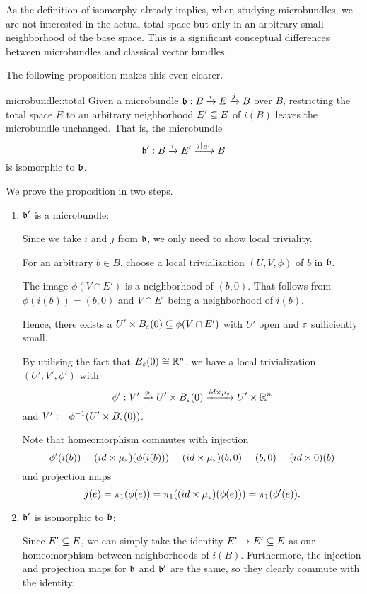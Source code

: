 \begin{myparagraph}
    As the definition of isomorphy already implies, when studying microbundles,
    we are not interested in the actual total space
    but only in an arbitrary small neighborhood of the base space.
    This is a significant conceptual differences between
    microbundles and classical vector bundles.

    The following proposition makes this even clearer.
\end{myparagraph}

\begin{myproposition}{microbundle::total}
    Given a microbundle $\bundledef{\bb}{B}{E}{i}{j}$ over $B$,
    restricting the total space $E$ to an
    arbitrary neighborhood $E' \sub E$ of $i(B)$ leaves the microbundle unchanged.
    That is, the microbundle
    \[ \bundledef{\bb'}{B}{E'}{i}{j\restr{E'}} \]
    is isomorphic to $\bb$.
\end{myproposition}

\begin{myproof}
    We prove the proposition in two steps.
    \begin{enumerate}
        \item $\bb'$ is a microbundle:
        
        Since we take $i$ and $j$ from $\bb$, we only need to show local triviality.

        For an arbitrary $b \in B$, choose a local trivialization $(U, V, \phi)$ of $b$ in $\bb$.
        
        The image $\phi(V \cap E')$ is a neighborhood of $(b, 0)$.
        That follows from $\phi(i(b)) = (b, 0)$ and $V \cap E'$ being a neighborhood of $i(b)$.

        Hence, there exists a $U' \times \ball[\eps] \sub \phi(V \cap E')$ with $U'$ open and $\eps$ sufficiently small.

        By utilising the fact that $\ball[\eps] \cong \R^n$, we have a local trivialization $(U', V', \phi')$ with
        \[ \phi': V' \xto{\phi} U' \times \ball[\eps] \xto{id \times \mu_\eps} U' \times \R^n \]
        and $V' := \inv{\phi}(U' \times \ball[\eps])$.

        Note that homeomorphism commutes with injection
        \[ \phi'(i(b)) =  (id \times \mu_\eps)(\phi(i(b))) = (id \times \mu_\eps)(b, 0) = (b, 0) = (id \times 0)(b)\]
        and projection maps
        \[ j(e) = \pi_1(\phi(e)) = \pi_1((id \times \mu_\eps)(\phi(e))) = \pi_1(\phi'(e)). \]
        
        \item $\bb'$ is isomorphic to $\bb$:

        Since $E' \sub E$, we can simply take the identity $E' \to E' \sub E$
        as our homeomorphism between neighborhoods of $i(B)$.
        Furthermore, the injection and projection maps for $\bb$ and $\bb'$ are the same,
        so they clearly commute with the identity.
    \end{enumerate}
\end{myproof}